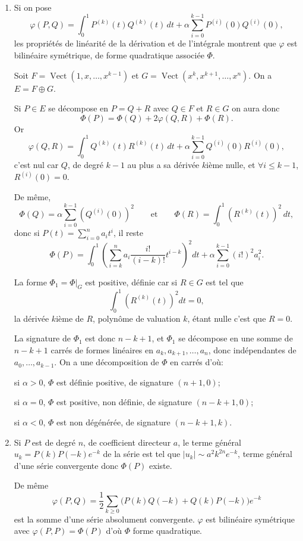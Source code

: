 \begin{enumerate}[label=\arabic*.,leftmargin=2.2em,itemsep=1.1em]
\item Si on pose
\[
\varphi(P,Q)=\int_0^1P^{(k)}(t)Q^{(k)}(t)\,dt
+\alpha\sum_{i=0}^{k-1}P^{(i)}(0)Q^{(i)}(0),
\]
les propriétés de linéarité de la dérivation et de l'intégrale montrent que $\varphi$ est bilinéaire symétrique, de forme quadratique associée $\Phi$.

Soit $F=\operatorname{Vect}(1,x,\ldots,x^{k-1})$ et $G=\operatorname{Vect}(x^k,x^{k+1},\ldots,x^n)$. On a $E=F\oplus G$.

Si $P\in E$ se décompose en $P=Q+R$ avec $Q\in F$ et $R\in G$ on aura donc
\[
\Phi(P)=\Phi(Q)+2\varphi(Q,R)+\Phi(R).
\]
Or
\[
\varphi(Q,R)=\int_0^1Q^{(k)}(t)R^{(k)}(t)\,dt
+\alpha\sum_{i=0}^{k-1}Q^{(i)}(0)R^{(i)}(0),
\]
c'est nul car $Q$, de degré $k-1$ au plus a sa dérivée $k$ième nulle, et $\forall i\le k-1$, $R^{(i)}(0)=0$.

De même,
\[
\Phi(Q)=\alpha\sum_{i=0}^{k-1}(Q^{(i)}(0))^2
\qquad\text{et}\qquad
\Phi(R)=\int_0^1(R^{(k)}(t))^2\,dt,
\]
donc si $P(t)=\sum_{i=0}^n a_it^i$, il reste
\[
\Phi(P)=\int_0^1\left(\sum_{i=k}^n a_i\frac{i!}{(i-k)!}t^{i-k}\right)^2dt
+\alpha\sum_{i=0}^{k-1}(i!)^2a_i^2.
\]

La forme $\Phi_1=\Phi|_G$ est positive, définie car si $R\in G$ est tel que
\[
\int_0^1(R^{(k)}(t))^2dt=0,
\]
la dérivée $k$ième de $R$, polynôme de valuation $k$, étant nulle c'est que $R=0$.

La signature de $\Phi_1$ est donc $n-k+1$, et $\Phi_1$ se décompose en une somme de $n-k+1$ carrés de formes linéaires en $a_k,a_{k+1},\ldots,a_n$, donc indépendantes de $a_0,\ldots,a_{k-1}$. On a une décomposition de $\Phi$ en carrés d'où:

si $\alpha>0$, $\Phi$ est définie positive, de signature $(n+1,0)$;

si $\alpha=0$, $\Phi$ est positive, non définie, de signature $(n-k+1,0)$;

si $\alpha<0$, $\Phi$ est non dégénérée, de signature $(n-k+1,k)$.

\item Si $P$ est de degré $n$, de coefficient directeur $a$, le terme général $u_k=P(k)P(-k)e^{-k}$ de la série est tel que $|u_k|\sim a^2k^{2n}e^{-k}$, terme général d'une série convergente donc $\Phi(P)$ existe.

De même
\[
\varphi(P,Q)=\frac12\sum_{k\ge0}\bigl(P(k)Q(-k)+Q(k)P(-k)\bigr)e^{-k}
\]
est la somme d'une série absolument convergente. $\varphi$ est bilinéaire symétrique avec $\varphi(P,P)=\Phi(P)$ d'où $\Phi$ forme quadratique.


\end{enumerate}
